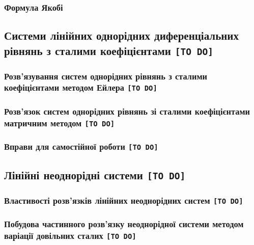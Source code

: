\documentclass[a4paper, 12pt]{article}
\theoremstyle{definition}
\newcommand{\todo}{\texttt{[TO DO]}}
\numberwithin{equation}{section}%
\numberwithin{equation}{subsection}
\begin{document}


\subsubsection{Формула Якобі}



\subsection{Системи лінійних однорідних диференціальних рівнянь з сталими коефіцієнтами \todo}



\subsubsection{Розв'язування систем однорідних рівнянь з сталими коефіцієнтами методом Ейлера \todo}



\subsubsection{Розв'язок систем однорідних рівнянь зі сталими коефіцієнтами матричним методом \todo}



\subsubsection{Вправи для самостійної роботи \todo}



\subsection{Лінійні неоднорідні системи \todo}



\subsubsection{Властивості розв'язків лінійних неоднорідних систем \todo}



\subsubsection{Побудова частинного розв'язку неоднорідної системи методом варіації довільних сталих \todo}
\end{document}
